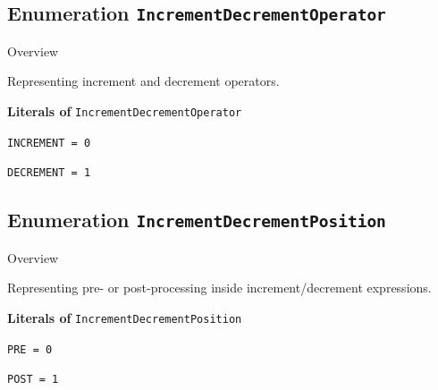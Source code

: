\subsection{Enumeration \bfseries \texttt{IncrementDecrementOperator}\normalfont}
\label{cls:uppaal::expressions::IncrementDecrementOperator} 

	\begin{longdescription}
		\item[Overview] 		
				

	

		Representing increment and decrement operators.		
	
		\item[\textbf{Literals of} \texttt{IncrementDecrementOperator}] ~
		\begin{longdescription}
			
\item[\texttt{INCREMENT = 0}] ~
\nopagebreak

\item[\texttt{DECREMENT = 1}] ~
\nopagebreak
		\end{longdescription}
	\end{longdescription}
	
	

\subsection{Enumeration \bfseries \texttt{IncrementDecrementPosition}\normalfont}
\label{cls:uppaal::expressions::IncrementDecrementPosition} 

	\begin{longdescription}
		\item[Overview] 		
				

	

		Representing pre- or post-processing inside increment/decrement expressions.		
	
		\item[\textbf{Literals of} \texttt{IncrementDecrementPosition}] ~
		\begin{longdescription}
			
\item[\texttt{PRE = 0}] ~
\nopagebreak

\item[\texttt{POST = 1}] ~
\nopagebreak
		\end{longdescription}
	\end{longdescription}
	
